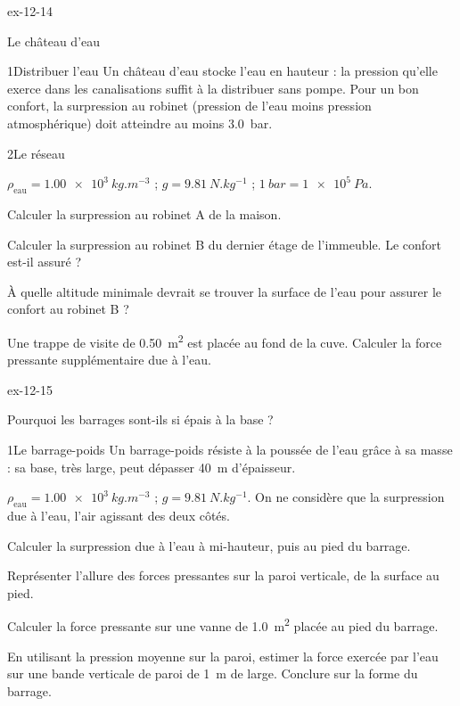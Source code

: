 \begin{blocLivre}{ex-12-14}
\begin{exercice}[3]{Le château d'eau}
\begin{docu}{1}{Distribuer l'eau}
Un château d'eau stocke l'eau en hauteur : la pression qu'elle exerce dans les canalisations suffit à la distribuer sans pompe.
Pour un bon confort, la surpression au robinet (pression de l'eau moins pression atmosphérique) doit atteindre au moins
\qty{3,0}{bar}.
\end{docu}
\begin{docu}{2}{Le réseau}
\end{docu}
\begin{donnees}
$\rho_\mathrm{eau}=\qty{1,00e3}{kg.m^{-3}}$ ; $g=\qty{9,81}{N.kg^{-1}}$ ; $\qty{1}{bar}=\qty{1e5}{Pa}$.
\end{donnees}
\begin{questions}
\item Calculer la surpression au robinet A de la maison.
\item Calculer la surpression au robinet B du dernier étage de l'immeuble. Le confort est-il assuré ?
\item \initiative À quelle altitude minimale devrait se trouver la surface de l'eau pour assurer le confort au robinet B ?
\item Une trappe de visite de \qty{0,50}{m^2} est placée au fond de la cuve. Calculer la force pressante supplémentaire due à l'eau.
\end{questions}
\end{exercice}
\end{blocLivre}
\begin{blocLivre}{ex-12-15}
\begin{exercice}[3]{Pourquoi les barrages sont-ils si épais à la base ?}
\begin{docu}{1}{Le barrage-poids}
Un barrage-poids résiste à la poussée de l'eau grâce à sa masse : sa base, très large, peut dépasser \qty{40}{m} d'épaisseur.
\end{docu}
\begin{donnees}
$\rho_\mathrm{eau}=\qty{1,00e3}{kg.m^{-3}}$ ; $g=\qty{9,81}{N.kg^{-1}}$. On ne considère que la surpression due à l'eau, l'air agissant des deux côtés.
\end{donnees}
\begin{questions}
\item Calculer la surpression due à l'eau à mi-hauteur, puis au pied du barrage.
\item Représenter l'allure des forces pressantes sur la paroi verticale, de la surface au pied.
\item Calculer la force pressante sur une vanne de \qty{1,0}{m^2} placée au pied du barrage.
\item \initiative En utilisant la pression moyenne sur la paroi, estimer la force exercée par l'eau sur une bande verticale de paroi
de \qty{1}{m} de large. Conclure sur la forme du barrage.
\end{questions}
\end{exercice}
\end{blocLivre}
